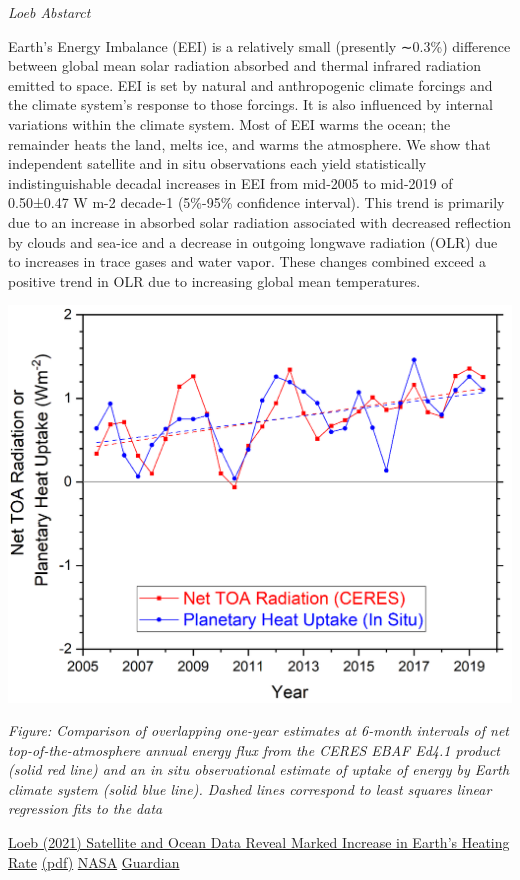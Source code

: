 \documentclass[
]{book}
\begin{document}
\emph{Loeb Abstarct}

Earth's Energy Imbalance (EEI) is a relatively small (presently ∼0.3\%) difference between global mean solar radiation absorbed and thermal infrared radiation emitted to space. EEI is set by natural and anthropogenic climate forcings and the climate system's response to those forcings. It is also influenced by internal variations within the climate system. Most of EEI warms the ocean; the remainder heats the land, melts ice, and warms the atmosphere. We show that independent satellite and in situ observations each yield statistically indistinguishable decadal increases in EEI from mid-2005 to mid-2019 of 0.50±0.47 W m-2 decade-1 (5\%-95\% confidence interval). This trend is primarily due to an increase in absorbed solar radiation associated with decreased reflection by clouds and sea-ice and a decrease in outgoing longwave radiation (OLR) due to increases in trace gases and water vapor. These changes combined exceed a positive trend in OLR due to increasing global mean temperatures.

\includegraphics{fig/earth_energy_imbalance.png}

\emph{Figure: Comparison of overlapping one-year estimates at 6-month intervals of net top-of-the-atmosphere annual
energy flux from the CERES EBAF Ed4.1 product (solid red line) and an in situ observational estimate of uptake of
energy by Earth climate system (solid blue line). Dashed lines correspond to least squares linear regression fits to the data}

\href{https://agupubs.onlinelibrary.wiley.com/doi/10.1029/2021GL093047}{Loeb (2021) Satellite and Ocean Data Reveal Marked Increase in Earth's Heating Rate}
\href{pdf/Loeb_2021_Earths_Heating_Rate.pdf}{(pdf)}
\href{https://www.nasa.gov/feature/langley/joint-nasa-noaa-study-finds-earths-energy-imbalance-has-doubled}{NASA}
\href{https://www.theguardian.com/science/2021/jun/17/earth-trapping-heat-study-nasa-noaa}{Guardian}
\end{document}
